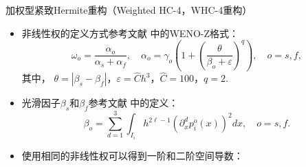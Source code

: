 \documentclass[aspectratio=169]{beamer}
\begin{document}
\begin{frame}{加权型紧致Hermite重构（Weighted HC-4，WHC-4重构）}
  
  \begin{itemize}[<+->]
    \item 非线性权的定义方式参考文献 \citep{WENO_Z} 中的WENO-Z格式：
          \begin{equation*}
            \omega_{{o}}=\frac{\alpha_{{o}}}{\alpha_{{s}}+\alpha_{{f}}}, \quad
            \alpha_{{o}}=\gamma_{{o}}\left( 1+\left( \frac{\theta}{\beta_{{o}}+\varepsilon}\right)^q \right) , \quad {{o}}={{s}}, {{f}},
          \end{equation*}
          其中，
          $\theta = |\beta_{{s}}-\beta_{{f}}|$，$\varepsilon=\widehat{C}h^3$，$\widehat{C}=100$，$q = 2$.
          
    \item 光滑因子$\beta_{{s}}$和$\beta_{{f}}$参考文献 \citep{WENO-1996} 中的定义：
          \begin{equation*}
            \beta_{{o}}= \sum_{d=1}^3 \int_{I_{i}}h^{2\ell-1}\left({\partial_{x}^{d}}p^{{o}}_{i}(x)\right)^2 dx, \quad {{o}}={{s}},{{f}}.
          \end{equation*}
          
    \item 使用相同的非线性权可以得到一阶和二阶空间导数：
  \end{itemize}
  
\end{frame}
\end{document}
